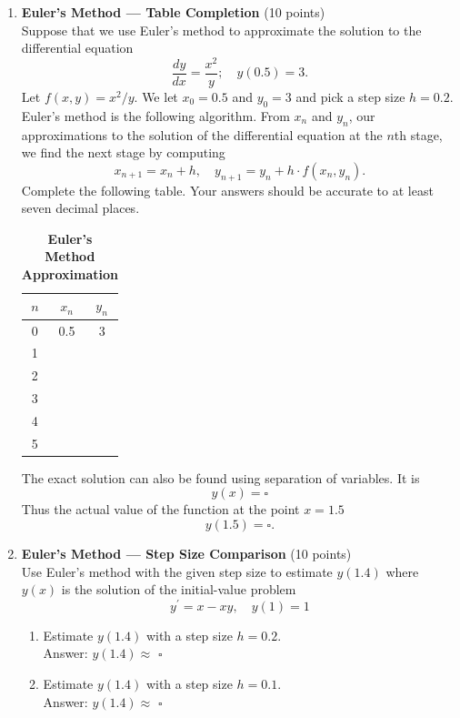 \begin{enumerate}
  \item \textbf{Euler's Method --- Table Completion} (10 points)\\
  Suppose that we use Euler's method to approximate the solution to the differential equation
  $$
  \frac{d y}{d x}=\frac{x^2}{y} ; \quad y(0.5)=3 .
  $$
  Let $f(x, y)=x^2 / y$.
  We let $x_0=0.5$ and $y_0=3$ and pick a step size $h=0.2$. Euler's method is the following algorithm. From $x_n$ and $y_n$, our approximations to the solution of the differential equation at the $n$th stage, we find the next stage by computing
  $$
  x_{n+1}=x_n+h, \quad y_{n+1}=y_n+h \cdot f\left(x_n, y_n\right) .
  $$
  Complete the following table. Your answers should be accurate to at least seven decimal places.
  \begin{table}[h!]
  \centering
  \renewcommand{\arraystretch}{1.3}
  \setlength{\tabcolsep}{12pt}
  \caption*{\textbf{Euler's Method Approximation}}
  \begin{tabular}{|c|c|c|}
  \hline
  \rowcolor[HTML]{E0E0E0}
  $n$ & $x_n$ & $y_n$ \\
  \hline 0 & 0.5 & 3 \\
  \hline 1 & & \\
  \hline 2 & & \\
  \hline 3 & & \\
  \hline 4 & & \\
  \hline 5 & & \\
  \hline
  \end{tabular}
  \end{table}
  \begin{subanswer}
  \end{subanswer}
  The exact solution can also be found using separation of variables. It is
  $$
  y(x)=\square
  $$
  Thus the actual value of the function at the point $x=1.5$
  $$
  y(1.5)=\square.
  $$
  \begin{subanswer}
  \end{subanswer}

  \item \textbf{Euler's Method --- Step Size Comparison} (10 points)\\
  Use Euler's method with the given step size to estimate $y(1.4)$ where $y(x)$ is the solution of the initial-value problem
  $$
  y^{\prime}=x-x y, \quad y(1)=1
  $$
  \begin{enumerate}[label=\arabic*.]
    \item Estimate $y(1.4)$ with a step size $h=0.2$.\\
    Answer: $y(1.4) \approx$ $\square$\\
    \begin{subanswer}
    \end{subanswer}
    \item Estimate $y(1.4)$ with a step size $h=0.1$.\\
    Answer: $y(1.4) \approx$ $\square$\\
    \begin{subanswer}
    \end{subanswer}
  \end{enumerate}


\end{enumerate}
